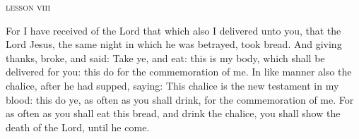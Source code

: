 \vspace{-9pt}
\begin{center}{\textsc{lesson viii}}\end{center}
\vspace{-6pt}

\begin{parcolumns}[rulebetween,colwidths={1=0.5\linewidth}]{2}
{For I have received of the Lord that which also I delivered unto you, that the Lord Jesus, the same night in which he was betrayed, took bread.
And giving thanks, broke, and said: Take ye, and eat: this is my body, which shall be delivered for you: this do for the commemoration of me.
In like manner also the chalice, after he had supped, saying: This chalice is the new testament in my blood: this do ye, as often as you shall drink, for the commemoration of me.
For as often as you shall eat this bread, and drink the chalice, you shall show the death of the Lord, until he come.}
\end{parcolumns}

